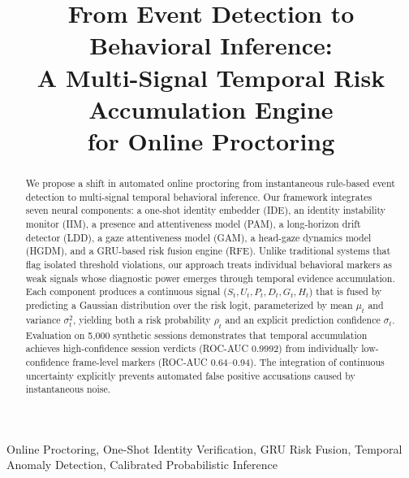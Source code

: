 \documentclass[conference]{IEEEtran}
\begin{document}
\title{From Event Detection to Behavioral Inference:\\A Multi-Signal Temporal Risk Accumulation Engine\\for Online Proctoring}

\author{
}

\maketitle

\begin{abstract}
We propose a shift in automated online proctoring from instantaneous rule-based event detection to multi-signal temporal behavioral inference. Our framework integrates seven neural components: a one-shot identity embedder (IDE), an identity instability monitor (IIM), a presence and attentiveness model (PAM), a long-horizon drift detector (LDD), a gaze attentiveness model (GAM), a head-gaze dynamics model (HGDM), and a GRU-based risk fusion engine (RFE). Unlike traditional systems that flag isolated threshold violations, our approach treats individual behavioral markers as weak signals whose diagnostic power emerges through temporal evidence accumulation. Each component produces a continuous signal ($S_t, U_t, P_t, D_t, G_t, H_t$) that is fused by predicting a Gaussian distribution over the risk logit, parameterized by mean $\mu_t$ and variance $\sigma_t^2$, yielding both a risk probability $\rho_t$ and an explicit prediction confidence $\sigma_t$. Evaluation on 5{,}000 synthetic sessions demonstrates that temporal accumulation achieves high-confidence session verdicts (ROC-AUC 0.9992) from individually low-confidence frame-level markers (ROC-AUC 0.64--0.94). The integration of continuous uncertainty explicitly prevents automated false positive accusations caused by instantaneous noise.
\end{abstract}

\begin{IEEEkeywords}
Online Proctoring, One-Shot Identity Verification, GRU Risk Fusion, Temporal Anomaly Detection, Calibrated Probabilistic Inference
\end{IEEEkeywords}

\end{document}
